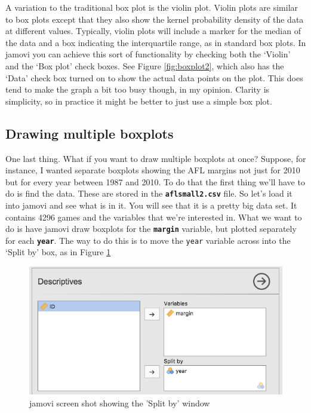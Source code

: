 \documentclass[
]{book}
\begin{document}
A variation to the traditional box plot is the violin plot. Violin plots are similar to box plots except that they also show the kernel probability density of the data at different values. Typically, violin plots will include a marker for the median of the data and a box indicating the interquartile range, as in standard box plots. In jamovi you can achieve this sort of functionality by checking both the `Violin' and the `Box plot' check boxes. See Figure \ref{fig:boxplot2}, which also has the `Data' check box turned on to show the actual data points on the plot. This does tend to make the graph a bit too busy though, in my opinion. Clarity is simplicity, so in practice it might be better to just use a simple box plot.

\hypertarget{multipleboxplots}{%
\subsection{Drawing multiple boxplots}\label{multipleboxplots}}

One last thing. What if you want to draw multiple boxplots at once? Suppose, for instance, I wanted separate boxplots showing the AFL margins not just for 2010 but for every year between 1987 and 2010. To do that the first thing we'll have to do is find the data. These are stored in the \textbf{\texttt{aflsmall2.csv}} file. So let's load it into jamovi and see what is in it. You will see that it is a pretty big data set. It contains 4296 games and the variables that we're interested in. What we want to do is have jamovi draw boxplots for the \textbf{\texttt{margin}} variable, but plotted separately for each \textbf{\texttt{year}}. The way to do this is to move the \texttt{year} variable across into the `Split by' box, as in Figure \ref{fig:splitfile1}

\begin{figure}

{\centering \includegraphics[width=1\linewidth]{img/graphics/splitfile1} 

}

\caption{jamovi screen shot showing the 'Split by' window}\label{fig:splitfile1}
\end{figure}
\end{document}
